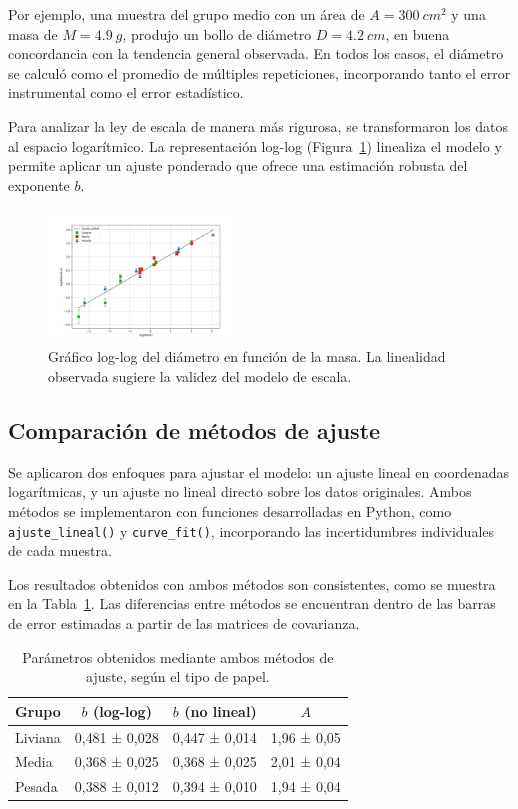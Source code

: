 \documentclass[12pt,a4]{article}
\begin{document}
Por ejemplo, una muestra del grupo medio con un área de \( A = \SI{300}{cm^2} \) y una masa de \( M = \SI{4.9}{g} \), produjo un bollo de diámetro \( D = \SI{4.2}{cm} \), en buena concordancia con la tendencia general observada. En todos los casos, el diámetro se calculó como el promedio de múltiples repeticiones, incorporando tanto el error instrumental como el error estadístico.

Para analizar la ley de escala de manera más rigurosa, se transformaron los datos al espacio logarítmico. La representación log-log (Figura~\ref{fig:loglog}) linealiza el modelo y permite aplicar un ajuste ponderado que ofrece una estimación robusta del exponente \( b \).

\begin{figure}[H]
    \centering
    \includegraphics[width=0.45\textwidth]{loglog_diametro_vs_masa.png}
    \caption{Gráfico log-log del diámetro en función de la masa. La linealidad observada sugiere la validez del modelo de escala.}
    \label{fig:loglog}
\end{figure}

\subsection{Comparación de métodos de ajuste}

Se aplicaron dos enfoques para ajustar el modelo: un ajuste lineal en coordenadas logarítmicas, y un ajuste no lineal directo sobre los datos originales. Ambos métodos se implementaron con funciones desarrolladas en Python, como \texttt{ajuste\_lineal()} y \texttt{curve\_fit()}, incorporando las incertidumbres individuales de cada muestra.

Los resultados obtenidos con ambos métodos son consistentes, como se muestra en la Tabla~\ref{tab:ajustes}. Las diferencias entre métodos se encuentran dentro de las barras de error estimadas a partir de las matrices de covarianza.

\begin{table}[H]
\centering
\begin{tabular}{@{}lccc@{}}
\toprule
\textbf{Grupo} & \textbf{\( b \)} (log-log) & \textbf{\( b \)} (no lineal) & \textbf{\( A \)} \\
\midrule
Liviana & 0{,}481 ± 0{,}028 & 0{,}447 ± 0{,}014 & 1{,}96 ± 0{,}05 \\
Media   & 0{,}368 ± 0{,}025 & 0{,}368 ± 0{,}025 & 2{,}01 ± 0{,}04 \\
Pesada  & 0{,}388 ± 0{,}012 & 0{,}394 ± 0{,}010 & 1{,}94 ± 0{,}04 \\
\bottomrule
\end{tabular}
\caption{Parámetros obtenidos mediante ambos métodos de ajuste, según el tipo de papel.}
\label{tab:ajustes}
\end{table}
\end{document}

